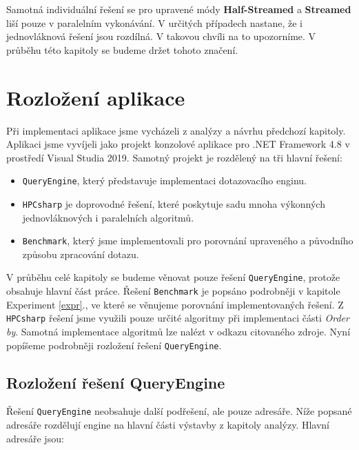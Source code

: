 Samotná individuální řešení se pro upravené módy \textbf{Half-Streamed} a \textbf{Streamed} liší pouze v paralelním vykonávání.
V určitých případech nastane, že i jednovláknová řešení jsou rozdílná.
V takovou chvíli na to upozorníme.
V průběhu této kapitoly se budeme držet tohoto značení.


\section{Rozložení aplikace}

Při implementaci aplikace jsme vycházeli z analýzy a návrhu předchozí kapitoly.
Aplikaci jsme vyvíjeli jako projekt konzolové aplikace pro .NET Framework 4.8 v prostředí Visual Studia 2019.
Samotný projekt je rozdělený na tři hlavní řešení:

\begin{itemize}

\item \texttt{QueryEngine}, který představuje implementaci dotazovacího enginu.
\item \texttt{HPCsharp} \citep{hpcsharp} je doprovodné řešení, které poskytuje sadu mnoha výkonných jednovláknových i paralelních algoritmů.
\item \texttt{Benchmark}, který jsme implementovali pro porovnání upraveného a původního způsobu zpracování dotazu. 

\end{itemize}

V průběhu celé kapitoly se budeme věnovat pouze řešení \texttt{QueryEngine}, protože obsahuje hlavní část práce.
Řešení \texttt{Benchmark} je popsáno podrobněji v kapitole Experiment \ref{expr}., ve které se věnujeme porovnání implementovaných řešení.
Z \texttt{HPCsharp} řešení jsme využili pouze určité algoritmy při implementaci části \textit{Order by}.
Samotná implementace algoritmů lze nalézt v odkazu citovaného zdroje. 
Nyní popíšeme podrobněji rozložení řešení \texttt{QueryEngine}.

\subsection{Rozložení řešení QueryEngine}

Řešení \texttt{QueryEngine} neobsahuje další podřešení, ale pouze adresáře.
Níže popsané adresáře rozdělují engine na hlavní části výstavby z kapitoly analýzy.
Hlavní adresáře jsou:


